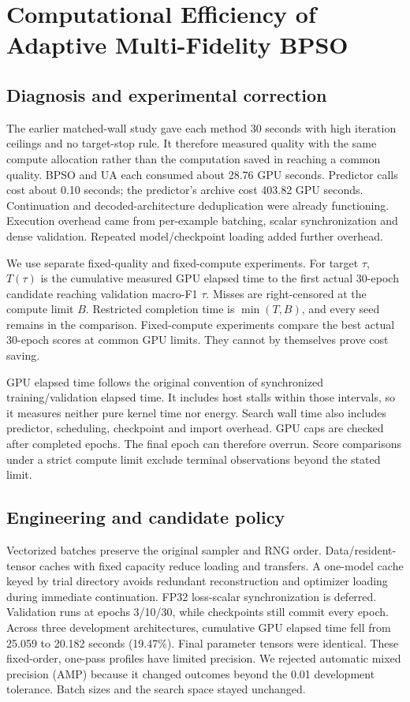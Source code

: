 \section{Computational Efficiency of Adaptive Multi-Fidelity BPSO}
\label{sec:amf-efficiency}
\subsection{Diagnosis and experimental correction}
The earlier matched-wall study gave each method 30 seconds with high iteration ceilings and no target-stop rule. It therefore measured quality with the same compute allocation rather than the computation saved in reaching a common quality. BPSO and UA each consumed about 28.76 GPU seconds. Predictor calls cost about 0.10 seconds; the predictor's archive cost 403.82 GPU seconds. Continuation and decoded-architecture deduplication were already functioning. Execution overhead came from per-example batching, scalar synchronization and dense validation. Repeated model/checkpoint loading added further overhead.

We use separate fixed-quality and fixed-compute experiments. For target $\tau$, $T(\tau)$ is the cumulative measured GPU elapsed time to the first actual 30-epoch candidate reaching validation macro-F1 $\tau$. Misses are right-censored at the compute limit $B$. Restricted completion time is $\min(T,B)$, and every seed remains in the comparison. Fixed-compute experiments compare the best actual 30-epoch scores at common GPU limits. They cannot by themselves prove cost saving.

GPU elapsed time follows the original convention of synchronized training/validation elapsed time. It includes host stalls within those intervals, so it measures neither pure kernel time nor energy. Search wall time also includes predictor, scheduling, checkpoint and import overhead. GPU caps are checked after completed epochs. The final epoch can therefore overrun. Score comparisons under a strict compute limit exclude terminal observations beyond the stated limit.

\subsection{Engineering and candidate policy}
Vectorized batches preserve the original sampler and RNG order. Data/resident-tensor caches with fixed capacity reduce loading and transfers. A one-model cache keyed by trial directory avoids redundant reconstruction and optimizer loading during immediate continuation. FP32 loss-scalar synchronization is deferred. Validation runs at epochs 3/10/30, while checkpoints still commit every epoch. Across three development architectures, cumulative GPU elapsed time fell from 25.059 to 20.182 seconds (19.47\%). Final parameter tensors were identical. These fixed-order, one-pass profiles have limited precision. We rejected automatic mixed precision (AMP) because it changed outcomes beyond the 0.01 development tolerance. Batch sizes and the search space stayed unchanged.

